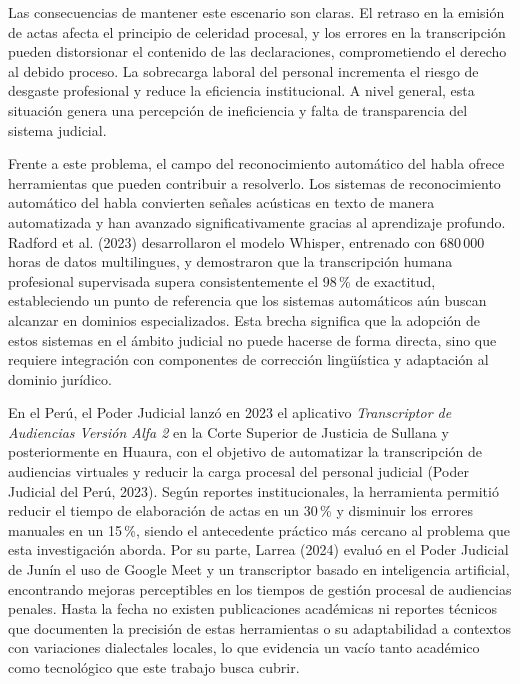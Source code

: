 \documentclass[12pt,a4paper,oneside]{article}
\begin{document}
Las consecuencias de mantener este escenario son claras. El retraso en la emisi\'on de actas afecta el principio de celeridad procesal, y los errores en la transcripci\'on pueden distorsionar el contenido de las declaraciones, comprometiendo el derecho al debido proceso. La sobrecarga laboral del personal incrementa el riesgo de desgaste profesional y reduce la eficiencia institucional. A nivel general, esta situaci\'on genera una percepci\'on de ineficiencia y falta de transparencia del sistema judicial.

Frente a este problema, el campo del reconocimiento autom\'atico del habla ofrece herramientas que pueden contribuir a resolverlo. Los sistemas de reconocimiento autom\'atico del habla convierten se\~nales ac\'usticas en texto de manera automatizada y han avanzado significativamente gracias al aprendizaje profundo. Radford et al. (2023) desarrollaron el modelo Whisper, entrenado con 680\,000 horas de datos multilingues, y demostraron que la transcripci\'on humana profesional supervisada supera consistentemente el 98\,\% de exactitud, estableciendo un punto de referencia que los sistemas autom\'aticos a\'un buscan alcanzar en dominios especializados. Esta brecha significa que la adopci\'on de estos sistemas en el \'ambito judicial no puede hacerse de forma directa, sino que requiere integraci\'on con componentes de correcci\'on ling\"u\'istica y adaptaci\'on al dominio jur\'idico.

En el Per\'u, el Poder Judicial lanz\'o en 2023 el aplicativo \textit{Transcriptor de Audiencias Versi\'on Alfa 2} en la Corte Superior de Justicia de Sullana y posteriormente en Huaura, con el objetivo de automatizar la transcripci\'on de audiencias virtuales y reducir la carga procesal del personal judicial (Poder Judicial del Per\'u, 2023). Seg\'un reportes institucionales, la herramienta permiti\'o reducir el tiempo de elaboraci\'on de actas en un 30\,\% y disminuir los errores manuales en un 15\,\%, siendo el antecedente pr\'actico m\'as cercano al problema que esta investigaci\'on aborda. Por su parte, Larrea (2024) evalu\'o en el Poder Judicial de Jun\'in el uso de Google Meet y un transcriptor basado en inteligencia artificial, encontrando mejoras perceptibles en los tiempos de gesti\'on procesal de audiencias penales. Hasta la fecha no existen publicaciones acad\'emicas ni reportes t\'ecnicos que documenten la precisi\'on de estas herramientas o su adaptabilidad a contextos con variaciones dialectales locales, lo que evidencia un vac\'io tanto acad\'emico como tecnol\'ogico que este trabajo busca cubrir.
\end{document}
